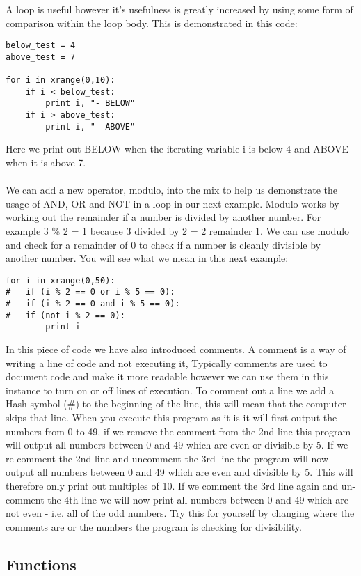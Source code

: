 \documentclass[twocolumn]{article}
\begin{document}
A loop is useful however it's usefulness is greatly increased by using some form of comparison within the loop body. This is demonstrated in this code:
\begin{lstlisting}
below_test = 4
above_test = 7

for i in xrange(0,10):
	if i < below_test:
		print i, "- BELOW"
	if i > above_test:
		print i, "- ABOVE"
\end{lstlisting}
Here we print out BELOW when the iterating variable i is below 4 and ABOVE when it is above 7.\\
\\
We can add a new operator, modulo, into the mix to help us demonstrate the usage of AND, OR and NOT in a loop in our next example. Modulo works by working out the remainder if a number is divided by another number. For example 3 \% 2 = 1 because 3 divided by 2 = 2 remainder 1. We can use modulo and check for a remainder of 0 to check if a number is cleanly divisible by another number. You will see what we mean in this next example:
 \begin{lstlisting}
for i in xrange(0,50):
#	if (i % 2 == 0 or i % 5 == 0):
#	if (i % 2 == 0 and i % 5 == 0):
#	if (not i % 2 == 0):
		print i
\end{lstlisting}
In this piece of code we have also introduced comments. A comment is a way of writing a line of code and not executing it, Typically comments are used to document code and make it more readable however we can use them in this instance to turn on or off lines of execution. To comment out a line we add a Hash symbol (\#) to the beginning of the line, this will mean that the computer skips that line. When you execute this program as it is it will first output the numbers from 0 to 49, if we remove the comment from the 2nd line this program will output all numbers between 0 and 49 which are even or divisible by 5. If we re-comment the 2nd line and uncomment the 3rd line the program will now output all numbers between 0 and 49 which are even and divisible by 5. This will therefore only print out multiples of 10. If we comment the 3rd line again and un-comment the 4th line we will now print all numbers between 0 and 49 which are not even - i.e. all of the odd numbers. Try this for yourself by changing where the comments are or the numbers the program is checking for divisibility.

\subsection{Functions}
\end{document}
